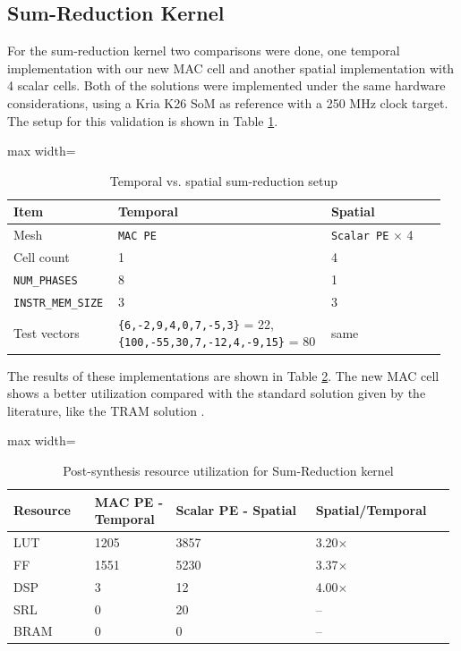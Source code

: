 \documentclass[conference]{IEEEtran}
\begin{document}
\subsection{Sum-Reduction Kernel}

For the sum-reduction kernel two comparisons were done, one temporal implementation with our new MAC cell and another spatial implementation with 4 scalar cells. 
Both of the solutions were implemented under the same hardware considerations, using a Kria K26 SoM as reference with a 250 MHz clock target.
The setup for this validation is shown in Table \ref{tab:sum_setup}.

\begin{table}[htbp]
\centering
\caption{Temporal vs. spatial sum-reduction setup}
\label{tab:sum_setup}
\scriptsize
\begin{adjustbox}{max width=\columnwidth}
\begin{tabular}{@{}p{0.22\linewidth}p{0.48\linewidth}p{0.26\linewidth}@{}}
\toprule
\textbf{Item} & \textbf{Temporal} & \textbf{Spatial} \\
\midrule
Mesh & \texttt{MAC PE} & \texttt{Scalar PE} $\times$ 4 \\
Cell count & 1 & 4 \\
\texttt{NUM\_PHASES} & 8 & 1 \\
\texttt{INSTR\_MEM\_SIZE} & 3 & 3 \\
Test vectors & \texttt{\{6,-2,9,4,0,7,-5,3\}} = 22, \texttt{\{100,-55,30,7,-12,4,-9,15\}} = 80 & same \\
\bottomrule
\end{tabular}
\end{adjustbox}
\end{table}


The results of these implementations are shown in Table \ref{tab:resource_util_sumReduction}. 
The new MAC cell shows a better utilization compared with the standard solution given by the literature, like the TRAM solution \cite{TRAM}. 

\begin{table}[htbp]
\centering
\caption{Post-synthesis resource utilization for Sum-Reduction kernel}
\label{tab:resource_util_sumReduction}
\scriptsize
\begin{adjustbox}{max width=\columnwidth}
\begin{tabular}{@{}p{0.18\linewidth}p{0.18\linewidth}p{0.31\linewidth}p{0.31\linewidth}@{}}
\toprule
\textbf{Resource} & \textbf{MAC PE - Temporal} & \textbf{Scalar PE - Spatial} & \textbf{Spatial/Temporal} \\
\midrule
LUT & 1205 & 3857 & 3.20$\times$ \\
FF & 1551 & 5230 & 3.37$\times$ \\
DSP & 3 & 12 & 4.00$\times$ \\
SRL & 0 & 20 & -- \\
BRAM & 0 & 0 & -- \\
\bottomrule
\end{tabular}
\end{adjustbox}
\end{table}
\end{document}
